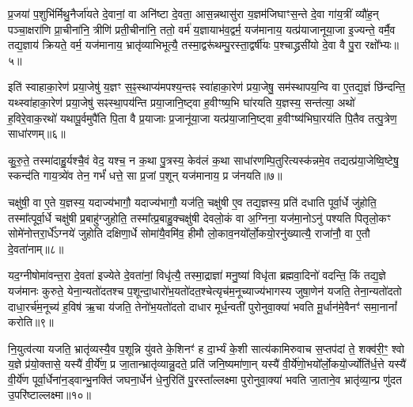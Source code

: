 प्र॒जया॑ प॒शुभि॑र्मिथु॒नैर्जा॑यते दे॒वानां॒ वा अनि॑ष्टा दे॒वता॒ आस॒न्नथासु॑रा य॒ज्ञम॑जिघाꣳस॒न्ते दे॒वा गा॑य॒त्रीं व्यौ॑ह॒न् पञ्चा॒क्षरा॑णि प्रा॒चीना॑नि॒ त्रीणि॑ प्रती॒चीना॑नि॒ ततो॒ वर्म॑ य॒ज्ञायाभ॑व॒द्वर्म॒ यज॑मानाय॒ यत्प्र॑याजानूया॒जा इ॒ज्यन्ते॒ वर्मै॒व तद्य॒ज्ञाय॑ क्रियते॒ वर्म॒ यज॑मानाय॒ भ्रातृ॑व्याभिभूत्यै॒ तस्मा॒द्वरू॑थम्पु॒रस्ता॒द्वर्\mbox{}षी॑यः प॒श्चाद्ध्रसी॑यो दे॒वा वै पु॒रा रक्षो᳚भ्यः॥५॥

इति॑ स्वाहाका॒रेण॑ प्रया॒जेषु॑ य॒ज्ञꣳ स॒ꣴ॒स्थाप्य॑मपश्य॒न्तꣴ स्वा॑हाका॒रेण॑ प्रया॒जेषु॒ सम॑स्थापय॒न्वि वा ए॒तद्य॒ज्ञं छि॑न्दन्ति॒ यथ्स्वा॑हाका॒रेण॑ प्रया॒जेषु॑ सꣴस्था॒पय॑न्ति प्रया॒जानि॒ष्ट्वा ह॒वीꣳष्य॒भि घा॑रयति य॒ज्ञस्य॒ सन्त॑त्या॒ अथो॑ ह॒विरे॒वाक॒रथो॑ यथापू॒र्वमुपै॑ति पि॒ता वै प्र॒याजाः प्र॒जानू॑या॒जा यत्प्र॑या॒जानि॒ष्ट्वा ह॒वीꣳष्य॑भिघा॒रय॑ति पि॒तैव तत्पु॒त्रेण॒ साधा॑रणम्॥६॥

कु॒रु॒ते॒ तस्मा॑दाहु॒र्यश्चै॒वं वेद॒ यश्च॒ न क॒था पु॒त्रस्य॒ केव॑लं क॒था साधा॑रणम्पि॒तुरित्यस्क॑न्नमे॒व तद्यत्प्र॑या॒जेष्वि॒ष्टेषु॒ स्कन्द॑ति गाय॒त्र्ये॑व तेन॒ गर्भं॑ धत्ते॒ सा प्र॒जां प॒शून् यज॑मानाय॒ प्र ज॑नयति॥७॥

{}

चक्षु॑षी॒ वा ए॒ते य॒ज्ञस्य॒ यदाज्य॑भागौ॒ यदाज्य॑भागौ॒ यज॑ति॒ चक्षु॑षी ए॒व तद्य॒ज्ञस्य॒ प्रति॑ दधाति पूर्वा॒र्धे जु॑होति॒ तस्मा᳚त्पूर्वा॒र्धे चक्षु॑षी प्र॒बाहु॑ग्जुहोति॒ तस्मा᳚त्प्र॒बाहु॒क्चक्षु॑षी देवलो॒कं वा अ॒ग्निना॒ यज॑मा॒नो\-ऽनु॑ पश्यति पितृलो॒कꣳ सोमे॑नोत्तरा॒र्धे᳚\-ऽग्नये॑ जुहोति दक्षिणा॒र्धे सोमा॑यै॒वमि॑व॒ हीमौ लो॒काव॒नयो᳚र्लो॒कयो॒रनु॑ख्यात्यै॒ राजा॑नौ॒ वा ए॒तौ दे॒वता॑नाम्॥८॥

यद॒ग्नीषोमा॑वन्त॒रा दे॒वता॑ इज्येते दे॒वता॑नां॒ विधृ॑त्यै॒ तस्मा॒द्राज्ञा॑ मनु॒ष्या॑ विधृ॑ता ब्रह्मवा॒दिनो॑ वदन्ति॒ किं तद्य॒ज्ञे यज॑मानः कुरुते॒ येना॒न्यतो॑दतश्च प॒शून्दा॒धारो॑भ॒यतो॑दत॒श्चेत्यृच॑म॒नूच्याज्य॑भागस्य जुषा॒णेन॑ यजति॒ तेना॒न्यतो॑दतो दाधा॒रर्च॑म॒नूच्य॑ ह॒विष॑ ऋ॒चा य॑जति॒ तेनो॑भ॒यतो॑दतो दाधार मूर्ध॒न्वती॑ पुरोनुवा॒क्या॑ भवति मू॒र्धान॑मे॒वैनꣳ॑ समा॒नानां᳚ करोति॥९॥

नि॒युत्व॑त्या यजति॒ भ्रातृ॑व्यस्यै॒व प॒शून्नि यु॑वते के॒शिनꣳ॑ ह दा॒र्भ्यं के॒शी सात्य॑कामिरुवाच स॒प्तप॑दां ते॒ शक्व॑री॒ꣳ॒ श्वो य॒ज्ञे प्र॑यो॒क्तासे॒ यस्यै॑ वी॒र्ये॑ण॒ प्र जा॒तान्भ्रातृ॑व्यान्नु॒दते॒ प्रति॑ जनि॒ष्यमा॑णा॒न् यस्यै॑ वी॒र्ये॑णो॒भयो᳚र्लो॒कयो॒र्ज्योति॑र्ध॒त्ते यस्यै॑ वी॒र्ये॑ण पूर्वा॒र्धेना॑न॒ड्वान्भु॒नक्ति॑ जघना॒र्धेन॑ धे॒नुरिति॑ पु॒रस्ता᳚ल्लक्ष्मा पुरोनुवा॒क्या॑ भवति जा॒ताने॒व भ्रातृ॑व्या॒न्प्र णु॑दत उ॒परि॑ष्टाल्लक्ष्मा॥१०॥

